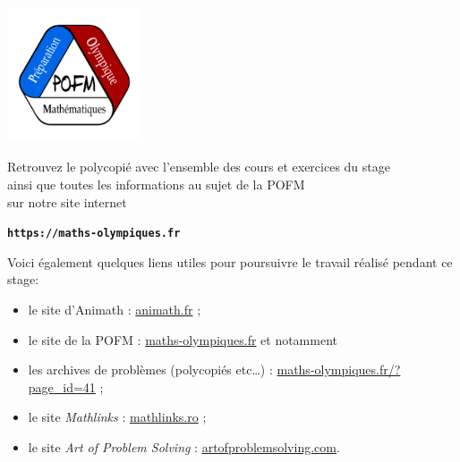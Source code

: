 \thispagestyle{empty} 

\mbox{ }

\vfill

\begin{center}
  \includegraphics[width=4cm]{01-Intro/logos/pofm.png}
  
  \vspace{1cm}
  
  Retrouvez le polycopié avec l'ensemble des cours et exercices du stage\\
  ainsi que toutes les informations au sujet de la POFM\\
  sur notre site internet
  
  \smallskip

  \textbf{\texttt{https://maths-olympiques.fr}}
  
  \bigskip
  
Voici également quelques liens utiles pour poursuivre le travail réalisé pendant ce
stage:
\begin{itemize}
\item le site d'Animath : \href{http://www.animath.fr}{animath.fr} ;
\item le site de la POFM : \href {http://www.maths-olympiques.fr}{maths-olympiques.fr} et notamment 
\item les archives de problèmes (polycopiés etc\ldots) : \href{http://www.maths-olympiques.fr/?page_id=41}{maths-olympiques.fr/?page\_id=41} ;
\item le site \emph{Mathlinks} : \href{http://www.mathlinks.ro}{mathlinks.ro} ;
\item le site \emph{Art of Problem Solving} : \href{https://www.artofproblemsolving.com}{artofproblemsolving.com}.
\end{itemize}

\end{center}

\vfill
